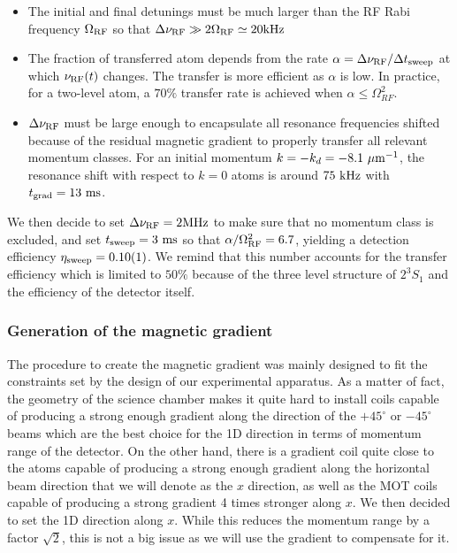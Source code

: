 \begin{itemize}
    \item The initial and final detunings must be much larger than the RF Rabi frequency $\Omega_{\rm{RF}}$ so that $\Delta \nu_{\rm{RF}} \gg 2 \Omega_{\rm{RF}} \simeq 20 \rm{kHz}$
    \item The fraction of transferred atom depends from the rate $\alpha = \Delta \nu_{\rm{RF}}/ \Delta t_{\rm{sweep}}$ at which $\nu_{\rm{RF}}(t)$ changes. The transfer is more efficient as $\alpha$ is low. In practice, for a two-level atom, a $70 \%$ transfer rate is achieved when $\alpha \leq \Omega_{RF}^2$.
    \item $\Delta \nu_{\rm{RF}}$ must be large enough to encapsulate all resonance frequencies shifted because of the residual magnetic gradient to properly transfer all relevant momentum classes. For an initial momentum $k=-k_d=-8.1 \ \mu \rm{m}^{-1}$, the resonance shift with respect to $k=0$ atoms is around $75 \ \rm{kHz}$ with $t_{\rm{grad}}=13 \ \rm{ms}$.
\end{itemize}

We then decide to set $\Delta \nu_{\rm{RF}}=2 \rm{MHz}$ to make sure that no momentum class is excluded, and set $t_{\rm{sweep}}=3 \ \rm{ms}$ so that $\alpha/\Omega^2_{\rm{RF}}=6.7$, yielding a detection efficiency $\eta_{\rm{sweep}}=0.10(1)$. We remind that this number accounts for the transfer efficiency which is limited to $50 \%$ because of the three level structure of $2 ^3 S_1$ and the efficiency of the detector itself.

\subsubsection{Generation of the magnetic gradient}

The procedure to create the magnetic gradient was mainly designed to fit the constraints set by the design of our experimental apparatus. As a matter of fact, the geometry of the science chamber makes it quite hard to install coils capable of producing a strong enough gradient along the direction of the $+45^{\circ}$ or $-45^{\circ}$ beams which are the best choice for the 1D direction in terms of momentum range of the detector. On the other hand, there is a gradient coil quite close to the atoms capable of producing a strong enough gradient along the horizontal beam direction that we will denote as the $x$ direction, as well as the MOT coils capable of producing a strong gradient 4 times stronger along $x$. We then decided to set the 1D direction along $x$. While this reduces the momentum range by a factor $\sqrt{2}$, this is not a big issue as we will use the gradient to compensate for it. 

